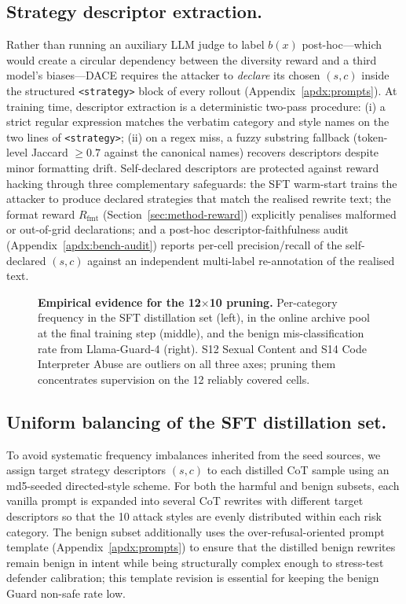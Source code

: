 \documentclass{article}
\newcommand{\method}{\textsc{DACE}\xspace}
\begin{document}
\subsection{Strategy descriptor extraction.}
\label{apdx:descriptor-extraction}

Rather than running an auxiliary LLM judge to label $b(x)$ post-hoc---which would create a circular dependency between the diversity reward and a third model's biases---\method requires the attacker to \emph{declare} its chosen $(s, c)$ inside the structured \texttt{<strategy>} block of every rollout (Appendix~\ref{apdx:prompts}). At training time, descriptor extraction is a deterministic two-pass procedure: (i) a strict regular expression matches the verbatim category and style names on the two lines of \texttt{<strategy>}; (ii) on a regex miss, a fuzzy substring fallback (token-level Jaccard $\geq 0.7$ against the canonical names) recovers descriptors despite minor formatting drift. Self-declared descriptors are protected against reward hacking through three complementary safeguards: the SFT warm-start trains the attacker to produce declared strategies that match the realised rewrite text; the format reward $R_{\mathrm{fmt}}$ (Section~\ref{sec:method-reward}) explicitly penalises malformed or out-of-grid declarations; and a post-hoc descriptor-faithfulness audit (Appendix~\ref{apdx:bench-audit}) reports per-cell precision/recall of the self-declared $(s, c)$ against an independent multi-label re-annotation of the realised text.

\begin{figure}[h]
  \centering
  \fbox{\rule[-2.0cm]{0pt}{4.0cm}\rule[-2.0cm]{0.95\linewidth}{0pt}}
  \caption{\textbf{Empirical evidence for the 12$\times$10 pruning.} Per-category frequency in the SFT distillation set (left), in the online archive pool at the final training step (middle), and the benign mis-classification rate from Llama-Guard-4 (right). S12 Sexual Content and S14 Code Interpreter Abuse are outliers on all three axes; pruning them concentrates supervision on the 12 reliably covered cells.}
  \label{fig:pruning-evidence}
\end{figure}

\subsection{Uniform balancing of the SFT distillation set.}
\label{apdx:sft-balance}

To avoid systematic frequency imbalances inherited from the seed sources, we assign target strategy descriptors $(s, c)$ to each distilled CoT sample using an md5-seeded directed-style scheme. For both the harmful and benign subsets, each vanilla prompt is expanded into several CoT rewrites with different target descriptors so that the 10 attack styles are evenly distributed within each risk category. The benign subset additionally uses the over-refusal-oriented prompt template (Appendix~\ref{apdx:prompts}) to ensure that the distilled benign rewrites remain benign in intent while being structurally complex enough to stress-test defender calibration; this template revision is essential for keeping the benign Guard non-safe rate low.
\end{document}
